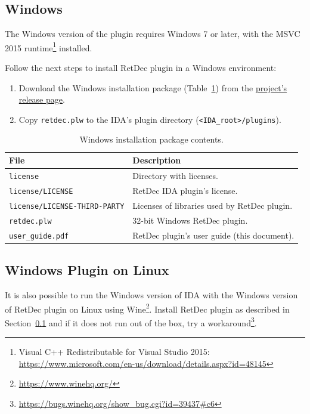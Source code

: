 \documentclass[pdftex, a4paper,12pt, oneside, svgnames]{article}
\begin{document}
\subsection{Windows}
\label{sec:installation:windows}
The Windows version of the plugin requires Windows 7 or later, with the MSVC 2015 runtime\footnote{Visual C++ Redistributable for Visual Studio 2015: \url{https://www.microsoft.com/en-us/download/details.aspx?id=48145}} installed.

Follow the next steps to install RetDec plugin in a Windows environment:
\begin{enumerate}
	\item Download the Windows installation package (Table~\ref{table:installation-package-windows}) from the \href{https://github.com/avast-tl/retdec-idaplugin/releases}{project's release page}.
	\item Copy \texttt{retdec.plw} to the IDA's plugin directory (\texttt{<IDA_root>/plugins}).
\end{enumerate}

\begin{table}[!ht]
\centering
\caption{Windows installation package contents.}
\label{table:installation-package-windows}
\begin{tabular}{ll}
\textbf{File} & \textbf{Description}\\
\hline
\texttt{license} & Directory with licenses. \\
\texttt{license/LICENSE} & RetDec IDA plugin's license. \\
\texttt{license/LICENSE-THIRD-PARTY} & Licenses of libraries used by RetDec plugin. \\
\texttt{retdec.plw} & 32-bit Windows RetDec plugin. \\
\texttt{user_guide.pdf} & RetDec plugin's user guide (this document). \\
\end{tabular}
\end{table}

\subsection{Windows Plugin on Linux}
It is also possible to run the Windows version of IDA with the Windows version of RetDec plugin on Linux using Wine\footnote{\url{https://www.winehq.org/}}. Install RetDec plugin as described in Section~\ref{sec:installation:windows} and if it does not run out of the box, try a workaround\footnote{\url{https://bugs.winehq.org/show_bug.cgi?id=39437\#c6}}.
\end{document}
